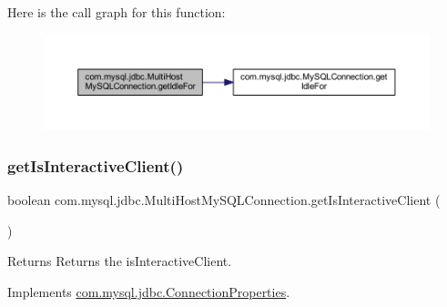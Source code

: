 Here is the call graph for this function\+:
\nopagebreak
\begin{figure}[H]
\begin{center}
\leavevmode
\includegraphics[width=350pt]{classcom_1_1mysql_1_1jdbc_1_1_multi_host_my_s_q_l_connection_a599b45b496d131fc0a7e56c867bbb3b0_cgraph}
\end{center}
\end{figure}
\mbox{\label{classcom_1_1mysql_1_1jdbc_1_1_multi_host_my_s_q_l_connection_a49aeeb12ed118d916aaba4f6144ce24d}} 
\subsubsection{\texorpdfstring{get\+Is\+Interactive\+Client()}{getIsInteractiveClient()}}
{\footnotesize\ttfamily boolean com.\+mysql.\+jdbc.\+Multi\+Host\+My\+S\+Q\+L\+Connection.\+get\+Is\+Interactive\+Client (\begin{DoxyParamCaption}{ }\end{DoxyParamCaption})}

\begin{DoxyReturn}{Returns}
Returns the is\+Interactive\+Client. 
\end{DoxyReturn}


Implements \mbox{\hyperlink{interfacecom_1_1mysql_1_1jdbc_1_1_connection_properties_a691575c40598ee5b000bed491d3ef096}{com.\+mysql.\+jdbc.\+Connection\+Properties}}.

